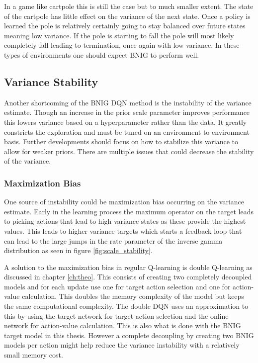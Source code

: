 In a game like cartpole this is still the case but to much smaller extent. The state of the cartpole has little effect on the variance of the next state. Once a policy is learned the pole is relatively certainly going to stay balanced over future states meaning low variance. If the pole is starting to fall the pole will most likely completely fall leading to termination, once again with low variance. In these types of environments one should expect BNIG to perform well.

\subsection{Variance Stability}

Another shortcoming of the BNIG DQN method is the instability of the variance estimate. Though an increase in the prior scale parameter improves performance this lowers variance based on a hyperparameter rather than the data. It greatly constricts the exploration and must be tuned on an environment to environment basis. Further developments should focus on how to stabilize this variance to allow for weaker priors. There are multiple issues that could decrease the stability of the variance.


\subsubsection{Maximization Bias}

One source of instability could be maximization bias \citep[p.~134]{sutton_barto_2018} occurring on the variance estimate. Early in the learning process the maximum operator on the target leads to picking actions that lead to high variance states as these provide the highest values. This leads to higher variance targets which starts a feedback loop that can lead to the large jumps in the rate parameter of the inverse gamma distribution as seen in figure \ref{fig:scale_stability}.

A solution to the maximization bias in regular Q-learning is double Q-learning as discussed in chapter \ref{ch:theo}. This consists of creating two completely decoupled models and for each update use one for target action selection and one for action-value calculation. This doubles the memory complexity of the model but keeps the same computational complexity. The double DQN uses an approximation to this by using the target network for target action selection and the online network for action-value calculation. This is also what is done with the BNIG target model in this thesis. However a complete decoupling by creating two BNIG models per action might help reduce the variance instability with a relatively small memory cost.

